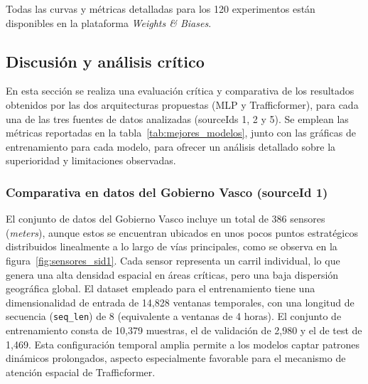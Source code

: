 Todas las curvas y métricas detalladas para los 120 experimentos están disponibles en la plataforma \textit{Weights \& Biases}.


\subsection{Discusión y análisis crítico}
\label{sec:discusion_analisis}

En esta sección se realiza una evaluación crítica y comparativa de los resultados obtenidos por las dos arquitecturas propuestas (MLP y Trafficformer), para cada una de las tres fuentes de datos analizadas (sourceIds 1, 2 y 5). Se emplean las métricas reportadas en la tabla~\ref{tab:mejores_modelos}, junto con las gráficas de entrenamiento para cada modelo, para ofrecer un análisis detallado sobre la superioridad y limitaciones observadas.

\subsubsection*{Comparativa en datos del Gobierno Vasco (sourceId 1)}

El conjunto de datos del Gobierno Vasco incluye un total de 386 sensores (\textit{meters}), aunque estos se encuentran ubicados en unos pocos puntos estratégicos distribuidos linealmente a lo largo de vías principales, como se observa en la figura~\ref{fig:sensores_sid1}. Cada sensor representa un carril individual, lo que genera una alta densidad espacial en áreas críticas, pero una baja dispersión geográfica global. El dataset empleado para el entrenamiento tiene una dimensionalidad de entrada de 14,828 ventanas temporales, con una longitud de secuencia (\texttt{seq\_len}) de 8 (equivalente a ventanas de 4 horas). El conjunto de entrenamiento consta de 10,379 muestras, el de validación de 2,980 y el de test de 1,469. Esta configuración temporal amplia permite a los modelos captar patrones dinámicos prolongados, aspecto especialmente favorable para el mecanismo de atención espacial de Trafficformer.

